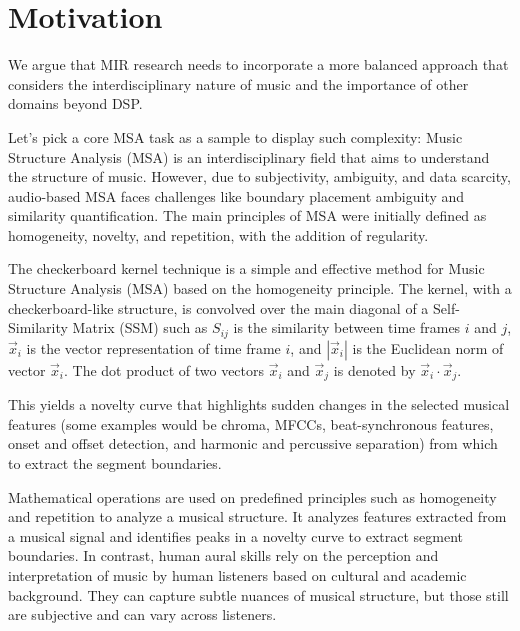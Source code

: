 \section{Motivation}

We argue that MIR research needs to incorporate a more balanced approach that considers the interdisciplinary nature of music and the importance of other domains beyond DSP.

Let's pick a core MSA task as a sample to display such complexity: Music Structure Analysis (MSA) is an interdisciplinary field that aims to understand the structure of music. However, due to subjectivity, ambiguity, and data scarcity, audio-based MSA faces challenges like boundary placement ambiguity and similarity quantification. The main principles of MSA were initially defined as homogeneity, novelty, and repetition, with the addition of regularity.

The checkerboard kernel technique is a simple and effective method for Music Structure Analysis (MSA) based on the homogeneity principle. The kernel, with a checkerboard-like structure, is convolved over the main diagonal of a Self-Similarity Matrix (SSM) such as $S_{ij}$ is the similarity between time frames $i$ and $j$, $\vec{x}_i$ is the vector representation of time frame $i$, and $\left| \vec{x}_i \right|$ is the Euclidean norm of vector $\vec{x}_i$. The dot product of two vectors $\vec{x}_i$ and $\vec{x}_j$ is denoted by $\vec{x}_i \cdot \vec{x}_j$.



This yields a novelty curve that highlights sudden changes in the selected musical features (some examples would be chroma, MFCCs, beat-synchronous features, onset and offset detection, and harmonic and percussive separation) from which to extract the segment boundaries.



Mathematical operations are used on predefined principles such as homogeneity and repetition to analyze a musical structure. It analyzes features extracted from a musical signal and identifies peaks in a novelty curve to extract segment boundaries. In contrast, human aural skills rely on the perception and interpretation of music by human listeners based on cultural and academic background. They can capture subtle nuances of musical structure, but those still are subjective and can vary across listeners.

